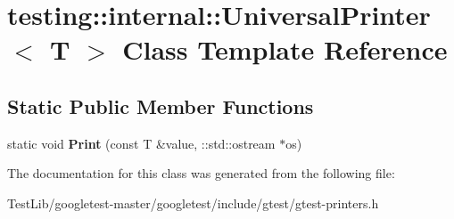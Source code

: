 \hypertarget{classtesting_1_1internal_1_1UniversalPrinter}{}\section{testing\+:\+:internal\+:\+:Universal\+Printer$<$ T $>$ Class Template Reference}
\label{classtesting_1_1internal_1_1UniversalPrinter}
\subsection*{Static Public Member Functions}
\begin{DoxyCompactItemize}
\item 
\mbox{\label{classtesting_1_1internal_1_1UniversalPrinter_aecec021e1abbaa260b701e24e3fe33eb}} 
static void {\bfseries Print} (const T \&value, \+::std\+::ostream $\ast$os)
\end{DoxyCompactItemize}


The documentation for this class was generated from the following file\+:\begin{DoxyCompactItemize}
\item 
Test\+Lib/googletest-\/master/googletest/include/gtest/gtest-\/printers.\+h\end{DoxyCompactItemize}
